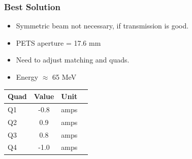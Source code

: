 \documentclass[professionalfonts,t]{beamer}
\begin{document}
\begin{frame}
\vspace{-1em }
\frametitle{Best Solution}
\tiny
\begin{minipage}{0.6\textwidth}
	\begin{itemize}
			\item Symmetric beam not necessary, if transmission is good.
			\item PETS aperture = 17.6 mm
			\item Need to adjust matching and quads.
			\item Energy $\approx$ 65 MeV
	\end{itemize}
\end{minipage}
\begin{minipage}{0.35\textwidth}
	\begin{table}[hbt] 
		\centering
		\begin{tabular}{ l *{3}{c}}
			\toprule
			\textbf{Quad} &  \textbf{Value} & \textbf{Unit} \\
			\midrule
			Q1	  & -0.8 & amps \\
			Q2 	  & 0.9  & amps \\
			Q3	  & 0.8  & amps \\
			Q4    & -1.0 & amps \\
			\bottomrule	
		\end{tabular}	
	\end{table}	
\end{minipage}

\vspace{1em}


\end{frame}
\end{document}
